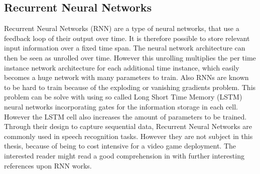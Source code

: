 
\subsection{Recurrent Neural Networks}\label{sec:prev_nn_rnn}
Recurrent Neural Networks (RNN) are a type of neural networks, that use a feedback loop of their output over time.
It is therefore possible to store relevant input information over a fixed time span.
The neural network architecture can then be seen as unrolled over time.
However this unrolling multiplies the per time instance network architecture for each additional time instance,
which easily becomes a huge network with many parameters to train.
Also RNNs are known to be hard to train because of the exploding or vanishing gradients problem.
This problem can be solve with using so called Long Short Time Memory (LSTM) neural networks incorporating gates for the information storage in each cell. However the LSTM cell also increases the amount of parameters to be trained.
Through their design to capture sequential data, Recurrent Neural Networks are commonly used in speech recognition tasks.
However they are not subject in this thesis, because of being to cost intensive for a video game deployment.
The interested reader might read a good comprehension in \cite{Staudenmeyer2019} with further interesting references upon RNN works.

